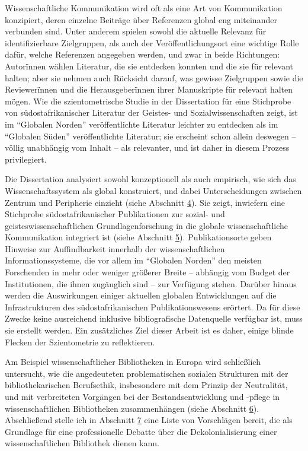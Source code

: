 \documentclass[a4paper,
fontsize=11pt,
oneside,
numbers=noperiodatend,
parskip=half-,
bibliography=totoc,
final
]{scrartcl}
\begin{document}
Wissenschaftliche Kommunikation wird oft als eine Art von Kommunikation
konzipiert, deren einzelne Beiträge über Referenzen global eng
miteinander verbunden sind. Unter anderem spielen sowohl die aktuelle
Relevanz für identifizierbare Zielgruppen, als auch der
Veröffentlichungsort eine wichtige Rolle dafür, welche Referenzen
angegeben werden, und zwar in beide Richtungen: Autorïnnen wählen
Literatur, die sie entdecken konnten und die sie für relevant halten;
aber sie nehmen auch Rücksicht darauf, was gewisse Zielgruppen sowie die
Reviewerïnnen und die Herausgeberïnnen ihrer Manuskripte für relevant
halten mögen. Wie die szientometrische Studie in der Dissertation für
eine Stichprobe von südostafrikanischer Literatur der Geistes- und
Sozialwissenschaften zeigt, ist im \enquote{Globalen Norden}
veröffentlichte Literatur leichter zu entdecken als im \enquote{Globalen
Süden} veröffentlichte Literatur; sie erscheint schon allein deswegen --
völlig unabhängig vom Inhalt -- als relevanter, und ist daher in diesem
Prozess privilegiert.

Die Dissertation analysiert sowohl konzeptionell als auch empirisch, wie
sich das Wissenschaftssystem als global konstruiert, und dabei
Unterscheidungen zwischen Zentrum und Peripherie einzieht (siehe
Abschnitt \protect\hyperlink{peripherie}{4}). Sie zeigt, inwiefern eine
Stichprobe südostafrikanischer Publikationen zur sozial- und
geisteswissenschaftlichen Grundlagenforschung in die globale
wissenschaftliche Kommunikation integriert ist (siehe Abschnitt
\protect\hyperlink{sziento}{5}). Publikationsorte geben Hinweise zur
Auffindbarkeit innerhalb der wissenschaftlichen Informationssysteme, die
vor allem im \enquote{Globalen Norden} den meisten Forschenden in mehr
oder weniger größerer Breite -- abhängig vom Budget der Institutionen,
die ihnen zugänglich sind -- zur Verfügung stehen. Darüber hinaus werden
die Auswirkungen einiger aktuellen globalen Entwicklungen auf die
Infrastrukturen des südostafrikanischen Publikationswesens erörtert. Da
für diese Zwecke keine ausreichend inklusive bibliografische Datenquelle
verfügbar ist, muss sie erstellt werden. Ein zusätzliches Ziel dieser
Arbeit ist es daher, einige blinde Flecken der Szientometrie zu
reflektieren.

Am Beispiel wissenschaftlicher Bibliotheken in Europa wird schließlich
untersucht, wie die angedeuteten problematischen sozialen Strukturen mit
der bibliothekarischen Berufsethik, insbesondere mit dem Prinzip der
Neutralität, und mit verbreiteten Vorgängen bei der Bestandsentwicklung
und -pflege in wissenschaftlichen Bibliotheken zusammenhängen (siehe
Abschnitt \protect\hyperlink{biblio}{6}). Abschließend stelle ich in
Abschnitt \protect\hyperlink{liste}{7} eine Liste von Vorschlägen
bereit, die als Grundlage für eine professionelle Debatte über die
Dekolonialisierung einer wissenschaftlichen Bibliothek dienen kann.
\end{document}
